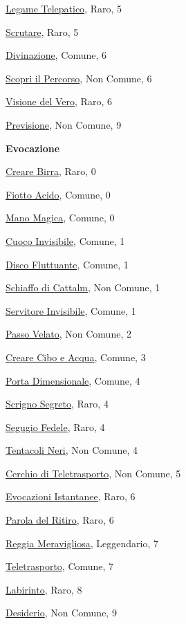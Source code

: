 \begin{multicols}{3}
{{\hyperlink{Legame Telepatico}{Legame Telepatico}, Raro, 5

\hyperlink{Scrutare}{Scrutare}, Raro, 5

\hyperlink{Divinazione}{Divinazione}, Comune, 6

\hyperlink{Scopri il Percorso}{Scopri il Percorso}, Non Comune, 6

\hyperlink{Visione del Vero}{Visione del Vero}, Raro, 6

\hyperlink{Previsione}{Previsione}, Non Comune, 9

\medskip\textbf{Evocazione}

\hyperlink{Creare Birra}{Creare Birra}, Raro, 0

\hyperlink{Fiotto Acido}{Fiotto Acido}, Comune, 0

\hyperlink{Mano Magica}{Mano Magica}, Comune, 0

\hyperlink{Cuoco Invisibile}{Cuoco Invisibile}, Comune, 1

\hyperlink{Disco Fluttuante}{Disco Fluttuante}, Comune, 1

\hyperlink{Schiaffo di Cattalm}{Schiaffo di Cattalm}, Non Comune, 1

\hyperlink{Servitore Invisibile}{Servitore Invisibile}, Comune, 1

\hyperlink{Passo Velato}{Passo Velato}, Non Comune, 2

\hyperlink{Creare Cibo e Acqua}{Creare Cibo e Acqua}, Comune, 3

\hyperlink{Porta Dimensionale}{Porta Dimensionale}, Comune, 4

\hyperlink{Scrigno Segreto}{Scrigno Segreto}, Raro, 4

\hyperlink{Segugio Fedele}{Segugio Fedele}, Raro, 4

\hyperlink{Tentacoli Neri}{Tentacoli Neri}, Non Comune, 4

\hyperlink{Cerchio di Teletrasporto}{Cerchio di Teletrasporto}, Non Comune, 5

\hyperlink{Evocazioni Istantanee}{Evocazioni Istantanee}, Raro, 6

\hyperlink{Parola del Ritiro}{Parola del Ritiro}, Raro, 6

\hyperlink{Reggia Meravigliosa}{Reggia Meravigliosa}, Leggendario, 7

\hyperlink{Teletrasporto}{Teletrasporto}, Comune, 7

\hyperlink{Labirinto}{Labirinto}, Raro, 8

\hyperlink{Desiderio}{Desiderio}, Non Comune, 9

}}
\end{multicols}
